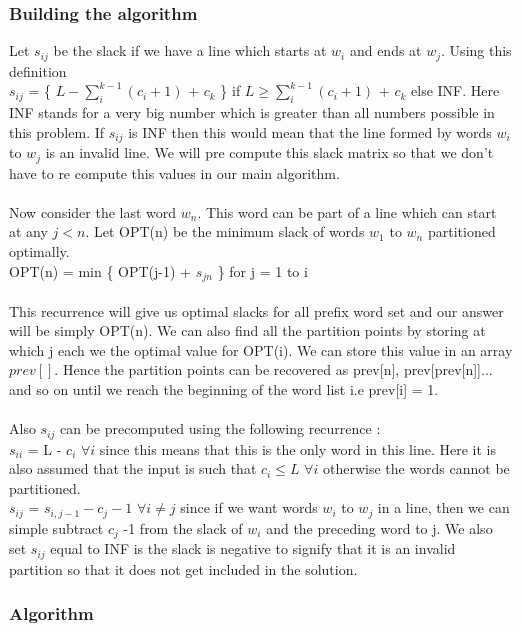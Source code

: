 \documentclass[12pt]{article}
\begin{document}
\subsubsection{Building the algorithm}
Let $s_{ij}$ be the slack if we have a line which starts at $w_i$ and ends at $w_j$. Using this definition \\
$s_{ij}$ = \{ $L - \sum\limits_{i}^{k-1} (c_i+1)$ + $c_k$ \} if $L \geq \sum\limits_{i}^{k-1} (c_i+1)$ + $c_k$ else INF. Here INF stands for a very big number which is greater than all numbers possible in this problem. If $s_{ij}$ is INF then this would mean that the line formed by words $w_i$ to $w_j$ is an invalid line. We will pre compute this slack matrix so that we don't have to re compute this values in our main algorithm.
\\\\
Now consider the last word $w_n$. This word can be part of a line which can start at any $j < n$. Let OPT(n) be the minimum slack of words $w_1$ to $w_n$ partitioned optimally. \\
OPT(n) = min \{ OPT(j-1) + $s_{jn}$ \} for j = 1 to i
\\\\
This recurrence will give us optimal slacks for all prefix word set and our answer will be simply OPT(n). We can also find all the partition points by storing at which j each we the optimal value for OPT(i). We can store this value in an array $prev[]$. Hence the partition points can be recovered as prev[n], prev[prev[n]]... and so on until we reach the beginning of the word list i.e prev[i] = 1.
\\\\
Also $s_{ij}$ can be precomputed using the following recurrence : \\
$s_{ii}$ = L - $c_i$ $\forall i$ since this means that this is the only word in this line. Here it is also assumed that the input is such that $c_i  \leq L$ $\forall i$ otherwise the words cannot be partitioned.\\
$s_{ij}$ = ${s_{i,j-1} - c_j -1}$ $\forall {i \neq j}$ since if we want words $w_i$ to $w_j$ in a line, then we can simple subtract $c_j$ -1 from the slack of $w_i$ and the preceding word to j. We also set $s_{ij}$ equal to INF is the slack is negative to signify that it is an invalid partition so that it does not get included in the solution.

\subsubsection{Algorithm}
\end{document}
